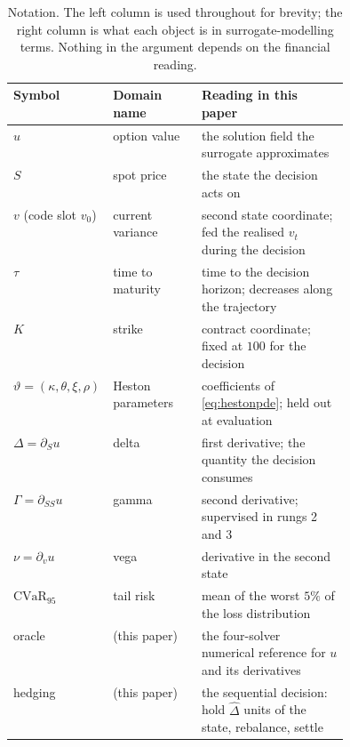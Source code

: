 \documentclass{article}
\begin{document}
\begin{table}[!htbp]
\caption{Notation. The left column is used throughout for brevity; the right column
is what each object is in surrogate-modelling terms. Nothing in the argument depends
on the financial reading.}
\label{tab:notation}
\centering\footnotesize\setlength{\tabcolsep}{5pt}
\begin{tabular}{@{}llp{0.44\linewidth}@{}}
\toprule
Symbol & Domain name & Reading in this paper \\
\midrule
$u$ & option value & the solution field the surrogate approximates \\
$S$ & spot price & the state the decision acts on \\
$v$ (code slot $v_0$) & current variance & second state coordinate; fed the realised $v_t$ during the decision \\
$\tau$ & time to maturity & time to the decision horizon; decreases along the trajectory \\
$K$ & strike & contract coordinate; fixed at $100$ for the decision \\
$\vartheta=(\kappa,\theta,\xi,\rho)$ & Heston parameters & coefficients of \eqref{eq:hestonpde}; held out at evaluation \\
$\Delta=\partial_S u$ & delta & first derivative; the quantity the decision consumes \\
$\Gamma=\partial_{SS}u$ & gamma & second derivative; supervised in rungs 2 and 3 \\
$\nu=\partial_v u$ & vega & derivative in the second state \\
$\mathrm{CVaR}_{95}$ & tail risk & mean of the worst $5\%$ of the loss distribution \\
oracle & (this paper) & the four-solver numerical reference for $u$ and its derivatives \\
hedging & (this paper) & the sequential decision: hold $\hat{\Delta}$ units of the state, rebalance, settle \\
\bottomrule
\end{tabular}
\end{table}
\end{document}
